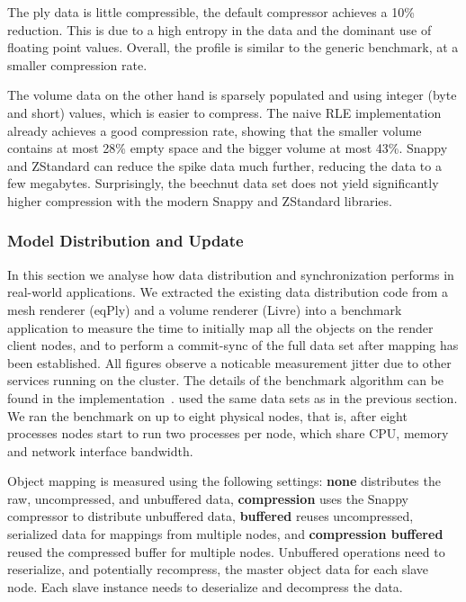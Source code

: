 \documentclass[10pt,journal,compsoc]{IEEEtran}
\begin{document}
The ply data is little compressible, the default compressor achieves a 10\%
reduction. This is due to a high entropy in the data and the dominant use of
floating point values. Overall, the profile is similar to the generic benchmark,
at a smaller compression rate.

The volume data on the other hand is sparsely populated and using integer (byte
and short) values, which is easier to compress. The naive RLE implementation
already achieves a good compression rate, showing that the smaller volume contains at
most 28\% empty space and the bigger volume at most 43\%. Snappy and ZStandard
can reduce the spike data much further, reducing the data to a few megabytes.
Surprisingly, the beechnut data set does not yield significantly higher
compression with the modern Snappy and ZStandard libraries.


\subsubsection{Model Distribution and Update}

In this section we analyse how data distribution and synchronization performs in
real-world applications. We extracted the existing data distribution code from a
mesh renderer (eqPly) and a volume renderer (Livre) into a benchmark application
to measure the time to initially map all the objects on the render client nodes,
and to perform a commit-sync of the full data set after mapping has been
established. All figures observe a noticable measurement jitter due to other
services running on the cluster. The details of the benchmark algorithm can be
found in the implementation~\cite{eqObjectBench}. used the same data sets as in
the previous section. We ran the benchmark on up to eight physical nodes, that
is, after eight processes nodes start to run two processes per node, which share
CPU, memory and network interface bandwidth.

Object mapping is measured using the following settings: \textbf{none}
distributes the raw, uncompressed, and unbuffered data, \textbf{compression}
uses the Snappy compressor to distribute unbuffered data, \textbf{buffered}
reuses uncompressed, serialized data for mappings from multiple nodes, and
\textbf{compression buffered} reused the compressed buffer for multiple nodes.
Unbuffered operations need to reserialize, and potentially recompress, the
master object data for each slave node. Each slave instance needs to deserialize
and decompress the data.
\end{document}
